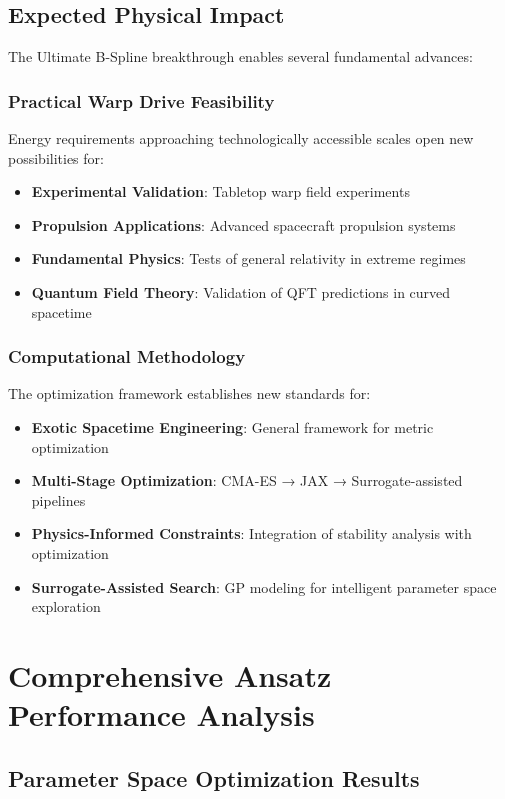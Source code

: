 \documentclass[12pt,a4paper]{article}
\begin{document}
\subsection{Expected Physical Impact}

The Ultimate B-Spline breakthrough enables several fundamental advances:

\subsubsection{Practical Warp Drive Feasibility}
Energy requirements approaching technologically accessible scales open new possibilities for:
\begin{itemize}
\item \textbf{Experimental Validation}: Tabletop warp field experiments
\item \textbf{Propulsion Applications}: Advanced spacecraft propulsion systems
\item \textbf{Fundamental Physics}: Tests of general relativity in extreme regimes
\item \textbf{Quantum Field Theory}: Validation of QFT predictions in curved spacetime
\end{itemize}

\subsubsection{Computational Methodology}
The optimization framework establishes new standards for:
\begin{itemize}
\item \textbf{Exotic Spacetime Engineering}: General framework for metric optimization
\item \textbf{Multi-Stage Optimization}: CMA-ES → JAX → Surrogate-assisted pipelines
\item \textbf{Physics-Informed Constraints}: Integration of stability analysis with optimization
\item \textbf{Surrogate-Assisted Search}: GP modeling for intelligent parameter space exploration
\end{itemize}

\section{Comprehensive Ansatz Performance Analysis}

\subsection{Parameter Space Optimization Results}
\end{document}
